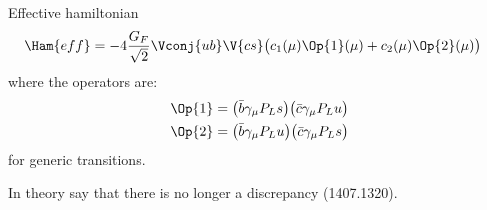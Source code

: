 Effective hamiltonian
\begin{align}
  \Ham{eff} &= -4\frac{G_F}{\sqrt{2}}\Vconj{ub}\V{cs}
  \big(
  c_1(\mu)\Op{1}(\mu) + c_2(\mu)\Op{2}(\mu)
  \big)
\end{align}
where the operators are:
\begin{align}
  \Op{1} &= \big(\bar b\gamma_\mu P_Ls\big) \big(\bar c\gamma_\mu P_Lu\big) \nonumber\\
  \Op{2} &= \big(\bar b\gamma_\mu P_Lu\big) \big(\bar c\gamma_\mu P_Ls\big)
\end{align}
\cite{Buchalla:1995vs}
for generic  transitions.

























In theory say that there is no longer a discrepancy (1407.1320).
\cite{PDG2012}
